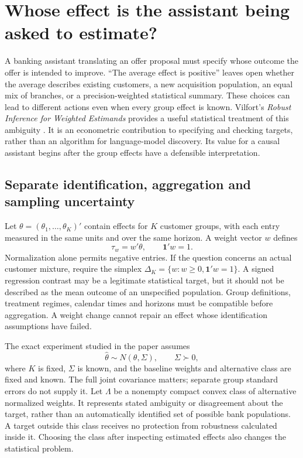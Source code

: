 \section{Whose effect is the assistant being asked to estimate?}
\label{exec22:targets-scope}

A banking assistant translating an offer proposal must specify whose outcome
the offer is intended to improve. ``The average effect is positive'' leaves
open whether the average describes existing customers, a new acquisition
population, an equal mix of branches, or a precision-weighted statistical
summary. These choices can lead to different actions even when every group
effect is known. Vilfort's \emph{Robust Inference for Weighted Estimands}
provides a useful statistical treatment of this ambiguity
\cite{exec22_weighted_vilfort}. It is an econometric contribution to specifying
and checking targets, rather than an algorithm for language-model discovery.
Its value for a causal assistant begins after the group effects have a
defensible interpretation.

\subsection{Separate identification, aggregation and sampling uncertainty}

Let $\theta=(\theta_1,\ldots,\theta_K)'$ contain effects for $K$ customer groups,
with each entry measured in the same units and over the same horizon. A weight
vector $w$ defines
\begin{equation}
 \tau_w=w'\theta,\qquad \mathbf{1}'w=1.
 \label{exec22:targets-definition}
\end{equation}
Normalization alone permits negative entries. If the question concerns an
actual customer mixture, require the simplex
$\Delta_K=\{w:w\geq0,\mathbf{1}'w=1\}$. A signed regression contrast may be a
legitimate statistical target, but it should not be described as the mean
outcome of an unspecified population. Group definitions, treatment regimes,
calendar times and horizons must be compatible before aggregation. A weight
change cannot repair an effect whose identification assumptions have failed.

The exact experiment studied in the paper assumes
\begin{equation}
 \widehat\theta\sim N(\theta,\Sigma),\qquad \Sigma\succ0,
 \label{exec22:targets-experiment}
\end{equation}
where $K$ is fixed, $\Sigma$ is known, and the baseline weights and alternative
class are fixed and known. The full joint covariance matters; separate group
standard errors do not supply it. Let $\Lambda$ be a nonempty compact convex
class of alternative normalized weights. It represents stated ambiguity or
disagreement about the target, rather than an automatically identified set of
possible bank populations. A target outside this class receives no protection
from robustness calculated inside it. Choosing the class after inspecting
estimated effects also changes the statistical problem.

